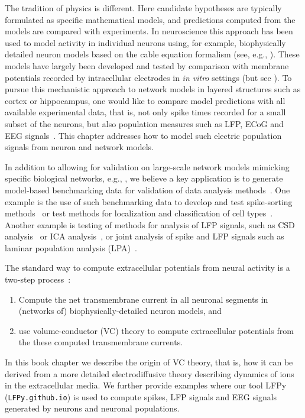 \documentclass[preprint,11pt,authoryear]{elsarticle}
\begin{document}
The tradition of physics is different. Here candidate hypotheses are typically formulated as specific mathematical models, and predictions computed from the models are compared with experiments. In neuroscience this approach has been used to model activity in individual neurons using, for example, biophysically detailed neuron models based on the cable equation formalism (see, e.g., \citet{Koch1999,Sterratt2011}). These models have largely been developed and tested by comparison with membrane potentials recorded by intracellular electrodes in 
\emph{in vitro} settings (but see \citet{Gold2007}).
To pursue this mechanistic approach to network models in layered structures such as cortex or hippocampus, 
one would like to compare model predictions with all available experimental data, that is, not only spike times recorded for a small subset of the neurons, but also population measures such as LFP, ECoG and EEG signals~\citep{Einevoll2019}. This chapter addresses how to model such electric population signals from neuron and network models.

In addition to allowing for validation on large-scale network models mimicking specific biological 
networks, e.g., \citet{Reimann2013,Markram2015,Billeh2020}, we believe a key application is to generate  
model-based benchmarking data for validation of data analysis methods~\citep{Denker2012}.
One example is the use of such benchmarking data to develop and test spike-sorting methods~\cite{Hagen2016, Buccino2019}
or test methods for localization and classification of cell types~\citep{DelgadoRuz2014, Buccino2018}.
Another example is testing of methods for analysis of LFP signals, such as CSD analysis~\citep{Pettersen2008,Leski2011,Ness2015} or 
ICA analysis~\citep{Glabska2014}, or joint analysis of spike and LFP signals such as laminar population analysis (LPA)~\citep{Glabska2016}.

The standard way to compute extracellular potentials from neural activity is a two-step process~\citep{Holt1999,Linden2014,Hagen2018}:
%
\begin{enumerate}
\item Compute the net transmembrane current in all neuronal segments in (networks of) biophysically-detailed neuron models, and
\item use volume-conductor (VC) theory to compute extracellular potentials from the these computed transmembrane currents.
\end{enumerate}
%
In this book chapter we describe the origin of VC theory, that is, how it can be derived from a more detailed electrodiffusive theory describing dynamics of ions in the extracellular media. We further provide examples where our tool LFPy (\texttt{LFPy.github.io}) \citep{Linden2014,Hagen2018} is used to compute spikes, LFP signals and EEG signals generated by neurons and neuronal populations.
\end{document}
